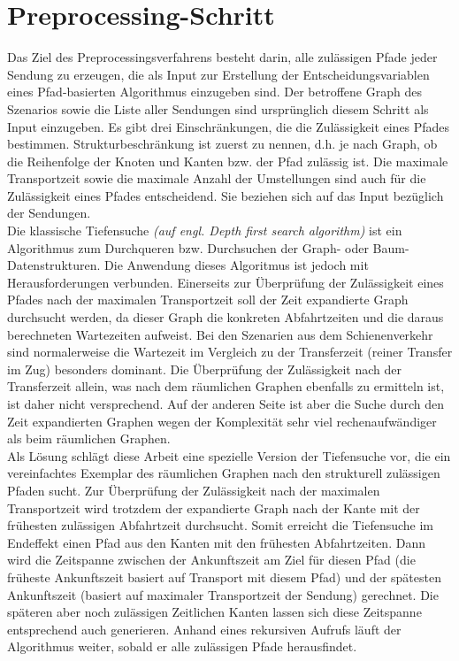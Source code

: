 \section{Preprocessing-Schritt}
Das Ziel des Preprocessingsverfahrens besteht darin, alle zulässigen Pfade jeder Sendung zu erzeugen, die als Input zur Erstellung der Entscheidungsvariablen eines Pfad-basierten Algorithmus einzugeben sind. Der betroffene Graph des Szenarios sowie die Liste aller Sendungen sind ursprünglich diesem Schritt als Input einzugeben. Es gibt drei Einschränkungen, die die Zulässigkeit eines Pfades bestimmen. Strukturbeschränkung ist zuerst zu nennen, d.h. je nach Graph, ob die Reihenfolge der Knoten und Kanten bzw. der Pfad zulässig ist. Die maximale Transportzeit sowie die maximale Anzahl der Umstellungen sind auch für die Zulässigkeit eines Pfades entscheidend. Sie beziehen sich auf das Input bezüglich der Sendungen.\\

Die klassische Tiefensuche \emph{(auf engl. Depth first search algorithm)} ist ein Algorithmus zum Durchqueren bzw. Durchsuchen der Graph- oder Baum-Datenstrukturen. Die Anwendung dieses Algoritmus ist jedoch mit Herausforderungen verbunden. Einerseits zur Überprüfung der Zulässigkeit eines Pfades nach der maximalen Transportzeit soll der Zeit expandierte Graph durchsucht werden, da dieser Graph die konkreten Abfahrtzeiten und die daraus berechneten Wartezeiten aufweist. Bei den Szenarien aus dem Schienenverkehr sind normalerweise die Wartezeit im Vergleich zu der Transferzeit (reiner Transfer im Zug) besonders dominant. Die Überprüfung der Zulässigkeit nach der Transferzeit allein, was nach dem räumlichen Graphen ebenfalls zu ermitteln ist, ist daher nicht versprechend. Auf der anderen Seite ist aber die Suche durch den Zeit expandierten Graphen wegen der Komplexität sehr viel rechenaufwändiger als beim räumlichen Graphen.\\

Als Lösung schlägt diese Arbeit eine spezielle Version der Tiefensuche vor, die ein vereinfachtes Exemplar des räumlichen Graphen nach den strukturell zulässigen Pfaden sucht. Zur Überprüfung der Zulässigkeit nach der maximalen Transportzeit wird trotzdem der expandierte Graph nach der Kante mit der frühesten zulässigen Abfahrtzeit durchsucht. Somit erreicht die Tiefensuche im Endeffekt einen Pfad aus den Kanten mit den frühesten Abfahrtzeiten. Dann wird die Zeitspanne zwischen der Ankunftszeit am Ziel für diesen Pfad (die früheste Ankunftszeit basiert auf Transport mit diesem Pfad) und der spätesten Ankunftszeit (basiert auf maximaler Transportzeit der Sendung) gerechnet. 
Die späteren aber noch zulässigen Zeitlichen Kanten lassen sich diese Zeitspanne entsprechend auch generieren. Anhand eines rekursiven Aufrufs läuft der Algorithmus weiter, sobald er alle zulässigen Pfade herausfindet.

